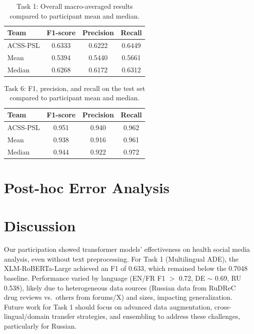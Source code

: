 \documentclass[letterpaper]{article} %
\begin{document}
\begin{table}[htbp]
    \centering
    \caption{Task 1: Overall macro-averaged results compared to participant mean and median.}
    \label{tab:task1-overall}
    \begin{tabular}{|l|c|c|c|}
    \hline
    \textbf{Team} & \textbf{F1-score} & \textbf{Precision} & \textbf{Recall} \\
    \hline
    ACSS-PSL & 0.6333 & 0.6222 & 0.6449 \\
    Mean     & 0.5394 & 0.5440 & 0.5661 \\
    Median   & 0.6268 & 0.6172 & 0.6312 \\
    \hline
    \end{tabular}
\end{table}



\begin{table}[htbp]
    \centering
    \caption{Task 6: F1, precision, and recall on the test set compared to participant mean and median.}
    \label{tab:task6-results}
    \begin{tabular}{|l|c|c|c|}
    \hline
    \textbf{Team} & \textbf{F1-score} & \textbf{Precision} & \textbf{Recall} \\
    \hline
    ACSS-PSL & 0.951 & 0.940 & 0.962 \\
    Mean     & 0.938 & 0.916 & 0.961 \\
    Median   & 0.944 & 0.922 & 0.972 \\
    \hline
    \end{tabular}
\end{table}



\section{Post-hoc Error Analysis}



\section{Discussion}
Our participation showed transformer models' effectiveness on health social media analysis, even without text preprocessing. For Task 1 (Multilingual ADE), the XLM-RoBERTa-Large achieved an F1 of 0.633, which remained below the 0.7048 baseline.
Performance varied by language (EN/FR F1 $>$ 0.72, DE $\sim$ 0.69, RU 0.538), likely due to heterogeneous data sources (Russian data from RuDReC drug reviews vs.\ others from forums/X) and sizes, impacting generalization.
Future work for Task 1 should focus on advanced data augmentation, cross-lingual/domain transfer strategies, and ensembling to address these challenges, particularly for Russian.
\end{document}
